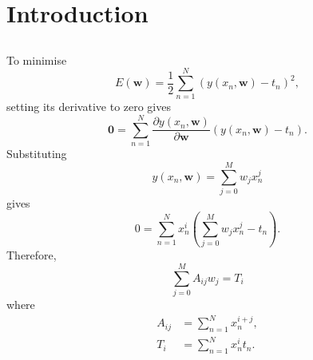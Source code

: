 \section{Introduction}


\subsection{}
To minimise 
%
\begin{equation}
E(\mathbf{w}) = \frac{1}{2} \sum_{n = 1}^{N} \left( y(x_n, \mathbf{w}) - t_n \right) ^ 2,
\end{equation}
%
setting its derivative to zero gives
%
\begin{equation}
\mathbf{0} = \sum_{n = 1}^{N} \frac{\partial y(x_n, \mathbf{w})}{\partial \mathbf{w}} \left( y(x_n, \mathbf{w}) - t_n \right).
\end{equation}
%
Substituting 
%
\begin{equation}
y(x_n, \mathbf{w}) = \sum_{j = 0}^{M} w_j x_n^j
\end{equation}
%
gives
%
\begin{equation}
0 = \sum_{n = 1}^{N} x_n^i \left( \sum_{j = 0}^{M} w_j x_n^j - t_n \right).
\end{equation}
%
Therefore,
%
\begin{equation}
\sum_{j = 0}^{M} A_{ij} w_j = T_i
\end{equation}
%
where
%
\begin{equation}
\begin{aligned}
A_{ij} &= \sum_{n = 1}^{N} x_n^{i + j}, \\
T_i &= \sum_{n = 1}^{N} x_n^i t_n.
\end{aligned}
\end{equation}


